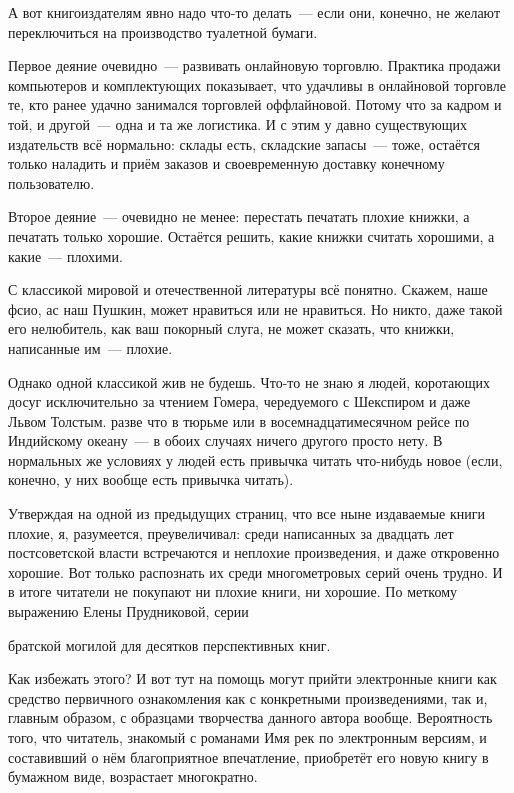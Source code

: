 А вот книгоиздателям явно надо что-то делать~--- если они, конечно, не желают переключиться на производство туалетной бумаги.

Первое деяние очевидно~--- развивать онлайновую торговлю. Практика продажи компьютеров и комплектующих показывает, что удачливы в онлайновой торговле те, кто ранее удачно занимался торговлей оффлайновой. Потому что за кадром и той, и другой~--- одна и та же логистика. И с этим у давно существующих издательств всё нормально: склады есть, складские запасы~--- тоже, остаётся только наладить и приём заказов и своевременную доставку конечному пользователю.

Второе деяние~--- очевидно не менее: перестать печатать плохие книжки, а печатать только хорошие. Остаётся решить, какие книжки считать хорошими, а какие~--- плохими.

С классикой мировой и отечественной литературы всё понятно. Скажем, наше фсио, ас наш Пушкин, может нравиться или не нравиться. Но никто, даже такой его нелюбитель, как ваш покорный слуга, не может сказать, что книжки, написанные им~--- плохие.

Однако одной классикой жив не будешь. Что-то не знаю я людей, коротающих досуг исключительно за чтением Гомера, чередуемого с Шекспиром и даже Львом Толстым. разве что в тюрьме или в восемнадцатимесячном рейсе по Индийскому океану~--- в обоих случаях ничего другого просто нету. В нормальных же условиях у людей есть привычка читать что-нибудь новое (если, конечно, у них вообще есть привычка читать).

Утверждая на одной из предыдущих страниц, что все ныне издаваемые книги плохие, я, разумеется, преувеличивал: среди написанных за двадцать лет постсоветской власти встречаются и неплохие произведения, и даже откровенно хорошие. Вот только распознать их среди многометровых серий очень трудно. И в итоге читатели не покупают ни плохие книги, ни хорошие. По меткому выражению Елены Прудниковой, серии


\begin{shadequote}{}
 братской могилой для десятков перспективных книг.
\end{shadequote}

Как избежать этого? И вот тут на помощь могут прийти электронные книги как средство первичного ознакомления как с конкретными произведениями, так и, главным образом, с образцами творчества данного автора вообще. Вероятность того, что читатель, знакомый с романами Имя рек по электронным версиям, и составивший о нём благоприятное впечатление, приобретёт его новую книгу в бумажном виде, возрастает многократно.

